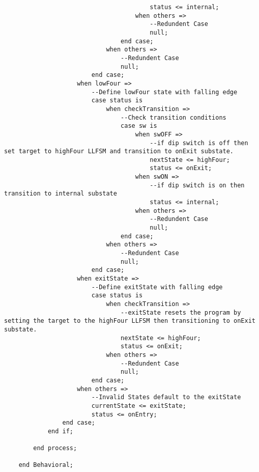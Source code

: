\documentclass{article}
\begin{document}
\begin{lstlisting}
										status <= internal;
									when others =>
										--Redundent Case
										null;
								end case;
							when others =>
								--Redundent Case
								null;
						end case;
					when lowFour =>
						--Define lowFour state with falling edge
						case status is
							when checkTransition =>
								--Check transition conditions
								case sw is
									when swOFF =>
										--if dip switch is off then set target to highFour LLFSM and transition to onExit substate.
										nextState <= highFour;
										status <= onExit;
									when swON =>
										--if dip switch is on then transition to internal substate
										status <= internal;
									when others =>
										--Redundent Case
										null;
								end case;
							when others =>
								--Redundent Case
								null;
						end case;
					when exitState =>
						--Define exitState with falling edge
						case status is
							when checkTransition =>
								--exitState resets the program by setting the target to the highFour LLFSM then transitioning to onExit substate.
								nextState <= highFour;
								status <= onExit;
							when others =>
								--Redundent Case
								null;
						end case;
					when others =>
						--Invalid States default to the exitState
						currentState <= exitState;
						status <= onEntry;
				end case;
			end if;
			
		end process;
	
	end Behavioral;
	\end{lstlisting}
\end{document}
